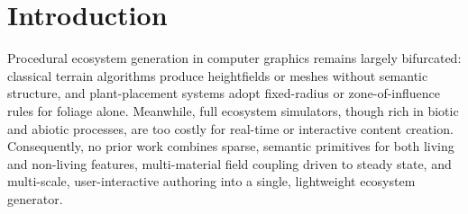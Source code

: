 
\section{Introduction}

Procedural ecosystem generation in computer graphics remains largely bifurcated: classical terrain algorithms produce heightfields or meshes without semantic structure, and plant-placement systems adopt fixed-radius or zone-of-influence rules for foliage alone. Meanwhile, full ecosystem simulators, though rich in biotic and abiotic processes, are too costly for real-time or interactive content creation. Consequently, no prior work combines sparse, semantic primitives for both living and non-living features, multi-material field coupling driven to steady state, and multi-scale, user-interactive authoring into a single, lightweight ecosystem generator.

